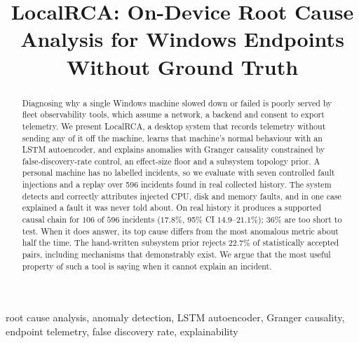 \documentclass[conference]{IEEEtran}
\begin{document}
\title{LocalRCA: On-Device Root Cause Analysis for Windows Endpoints Without
Ground Truth}

\author{
}

\maketitle

\begin{abstract}
Diagnosing why a single Windows machine slowed down or failed is poorly served
by fleet observability tools, which assume a network, a backend and consent to
export telemetry. We present LocalRCA, a desktop system that records telemetry
without sending any of it off the machine, learns that machine's normal
behaviour with an LSTM autoencoder, and explains anomalies with Granger
causality constrained by false-discovery-rate control, an effect-size floor and
a subsystem topology prior. A personal machine has no labelled incidents, so we
evaluate with seven controlled fault injections and a replay over 596 incidents
found in real collected history. The system detects and correctly attributes
injected CPU, disk and memory faults, and in one case explained a fault it was
never told about. On real history it produces a supported causal chain for
$106$ of $596$ incidents ($17.8\%$, 95\% CI $14.9$--$21.1\%$); $36\%$ are
too short to test. When it does answer, its top cause differs from the most
anomalous metric about half the time. The
hand-written subsystem prior rejects $22.7\%$ of statistically accepted pairs,
including mechanisms that demonstrably exist. We argue that the most useful
property of such a tool is saying when it cannot explain an incident.
\end{abstract}

\begin{IEEEkeywords}
root cause analysis, anomaly detection, LSTM autoencoder, Granger causality,
endpoint telemetry, false discovery rate, explainability
\end{IEEEkeywords}

\end{document}

